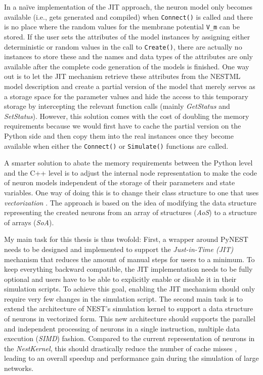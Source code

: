 In a na\"ive implementation of the JIT approach, the neuron model only becomes available (i.e., gets generated and compiled) when \texttt{Connect()} is called and there is no place where the random values for the membrane potential \texttt{V\_m} can be stored. If the user sets the attributes of the model instances by assigning either deterministic or random values in the call to \texttt{Create()}, there are actually no instances to store these and the names and data types of the attributes are only available after the complete code generation of the models is finished. One way out is to let the JIT mechanism retrieve these attributes from the NESTML model description and create a partial version of the model that merely serves as a storage space for the parameter values and hide the access to this temporary storage by intercepting the relevant function calls (mainly \emph{GetStatus} and \emph{SetStatus}). However, this solution comes with the cost of doubling the memory requirements because we would first have to cache the partial version on the Python side and then copy them into the real instances once they become available when either the \texttt{Connect()} or \texttt{Simulate()} functions are called.

A smarter solution to abate the memory requirements between the Python level and the C++ level is to adjust the internal node representation to make the code of neuron models independent of the storage of their parameters and state variables. One way of doing this is to change their class structure to one that uses \emph{vectorization} \citep{nuzman2006auto}. The approach is based on the idea of modifying the data structure representing the created neurons from an array of structures (\emph{AoS}) to a structure of arrays (\emph{SoA}).

My main task for this thesis is thus twofold: First, a wrapper around PyNEST needs to be designed and implemented to support the \emph{Just-in-Time (JIT)} mechanism that reduces the amount of manual steps for users to a minimum. To keep everything backward compatible, the JIT implementation needs to be fully optional and users have to be able to explicitly enable or disable it in their simulation scripts. To achieve this goal, enabling the JIT mechanism should only require very few changes in the simulation script. The second main task is to extend the architecture of NEST's simulation kernel to support a data structure of neurons in vectorized form. This new architecture should supports the parallel and independent processing of neurons in a single instruction, multiple data execution (\emph{SIMD}) fashion. Compared to the current representation of neurons in the \emph{NestKernel}, this should drastically reduce the number of cache misses \citep{ghosh1997cache}, leading to an overall speedup and performance gain during the simulation of large networks.

